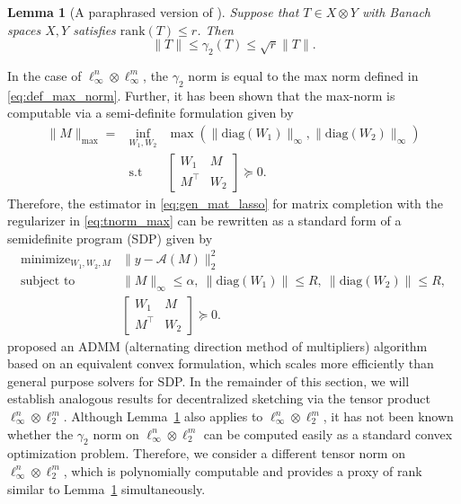 \documentclass[11pt]{article}
\newtheorem{lemma}{Lemma}[section]
\begin{document}
\begin{lemma}[{A paraphrased version of \cite[Lemma~4.2]{linial2007complexity}}]
\label{lemma:linial}
Suppose that $T \in X \otimes Y$ with Banach spaces $X,Y$ satisfies $\mathrm{rank}(T) \leq r$. Then
\[
\|T\| \leq \gamma_2(T) \leq \sqrt{r} \|T\|.
\]
\end{lemma}
In the case of $\ell_\infty^n \otimes \ell_\infty^m$, the $\gamma_2$ norm is equal to the max norm defined in \eqref{eq:def_max_norm}.
Further, it has been shown \cite{srebro2004maximum} that the max-norm is computable via a semi-definite formulation given by
\begin{equation}
\label{eq:max_norm_semidefinite}
\begin{array}{lll}
\|M\|_{\max}
= & \displaystyle \underset{W_1, W_2}{\inf} & \max \left ( \| \mathrm{diag}(W_1)\|_{\infty} , \|\mathrm{diag}(W_2) \|_\infty \right ) \\
& \mathrm{s.t} & \begin{bmatrix} W_1 & M\\ M^\top & W_2 \end{bmatrix} \succeq 0.
\end{array}
\end{equation} 
Therefore, the estimator in \eqref{eq:gen_mat_lasso} for matrix completion with the regularizer in \eqref{eq:tnorm_max} can be rewritten as a standard form of a semidefinite program (SDP) given by
\begin{equation}
\label{eq:max_norm_estimator_SDP}
\begin{array}{ll}
\displaystyle \mathop{\text{minimize}}_{W_1, W_2, M} & \|y - \mathcal{A}(M)\|_2^2 \\
\text{subject to} & \|M\|_\infty \leq \alpha, \ \|\mathrm{diag}(W_1)\| \leq R, \ \|\mathrm{diag}(W_2)\| \leq R,
\\[5pt]
& \begin{bmatrix} W_1 & M\\ M^\top & W_2 \end{bmatrix} \succeq 0.
\end{array}
\end{equation}
\citet{cai2016matrix} proposed an ADMM (alternating direction method of multipliers) algorithm based on an equivalent convex formulation, which scales more efficiently than general purpose solvers for SDP. 
In the remainder of this section, we will establish analogous results for decentralized sketching via the tensor product $\ell_\infty^n \otimes \ell_2^m$. 
Although Lemma~\ref{lemma:linial} also applies to $\ell_\infty^n \otimes \ell_2^m$, it has not been known whether the $\gamma_2$ norm on $\ell_\infty^n \otimes \ell_2^m$ can be computed easily as a standard convex optimization problem. 
Therefore, we consider a different tensor norm on $\ell_\infty^n \otimes \ell_2^m$, which is polynomially computable and provides a proxy of rank similar to Lemma~\ref{lemma:linial} simultaneously.
\end{document}
